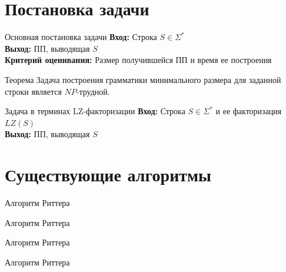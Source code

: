 \documentclass[utf8]{beamer}
\begin{document}
\section{Постановка задачи}

\begin{frame}
	\begin{block}{Основная постановка задачи}
		\textbf{Вход:} Строка $S \in \Sigma^*$ \\
		\textbf{Выход:} ПП, выводящая $S$ \\
		\textbf{Критерий оценивания:} Размер получившейся ПП и время ее построения
	\end{block}
	
	\pause
	
	\begin{block}{Теорема}
		Задача построения грамматики минимального размера для
		заданной строки является $NP$-трудной. 
	\end{block}
	
	\pause
	
	\begin{block}{Задача в терминах LZ-факторизации}
		\textbf{Вход:} Строка $S \in \Sigma^*$ и ее факторизация $LZ(S)$ \\
		\textbf{Выход:} ПП, выводящая $S$
	\end{block}
\end{frame}

\section{Существующие алгоритмы}
    
\begin{frame}
	\begin{block}{Алгоритм Риттера}
		\picRytterFirst
	\end{block}
\end{frame}

\begin{frame}
	\begin{block}{Алгоритм Риттера}
		\picRytterSecond
	\end{block}
\end{frame}

\begin{frame}
	\begin{block}{Алгоритм Риттера}
		\picRytterThird   
	\end{block}
\end{frame}

\begin{frame}
	\begin{block}{Алгоритм Риттера}
		\picRytterFourth  
	\end{block}
\end{frame}
\end{document}
